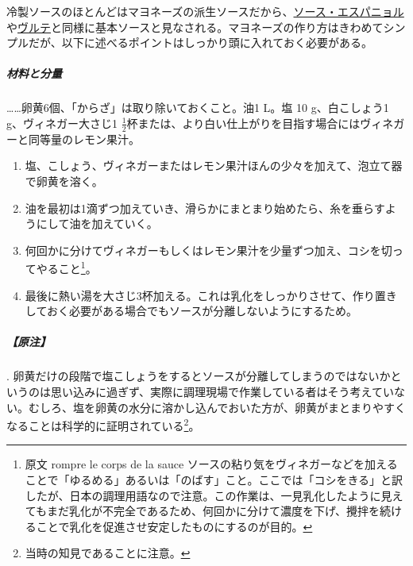 \begin{recette}

 

冷製ソースのほとんどはマヨネーズの派生ソースだから、\protect\hyperlink{sauce-espagnole}{ソース・エスパニョル}や\protect\hyperlink{veloute}{ヴルテ}と同様に基本ソースと見なされる。マヨネーズの作り方はきわめてシンプルだが、以下に述べるポイントはしっかり頭に入れておく必要がある。

\hypertarget{proportions-mayonnaise}{%
\subparagraph{材料と分量}\label{proportions-mayonnaise}}

\ldots{}\ldots{}卵黄6個、「からざ」は取り除いておくこと。油1 L。塩 10
g、白こしょう1 g、ヴィネガー大さじ1
\(\frac{1}{2}\)杯または、より白い仕上がりを目指す場合にはヴィネガーと同等量のレモン果汁。

\begin{enumerate}
\def\labelenumi{\arabic{enumi}.}
\item
  塩、こしょう、ヴィネガーまたはレモン果汁ほんの少々を加えて、泡立て器で卵黄を溶く。
\item
  油を最初は1滴ずつ加えていき、滑らかにまとまり始めたら、糸を垂らすようにして油を加えていく。
\item
  何回かに分けてヴィネガーもしくはレモン果汁を少量ずつ加え、コシを切ってやること\footnote{原文
    rompre le corps de la sauce
    ソースの粘り気をヴィネガーなどを加えることで「ゆるめる」あるいは「のばす」こと。ここでは「コシをきる」と訳したが、日本の調理用語なので注意。この作業は、一見乳化したように見えてもまだ乳化が不完全であるため、何回かに分けて濃度を下げ、攪拌を続けることで乳化を促進させ安定したものにするのが目的。}。
\item
  最後に熱い湯を大さじ3杯加える。これは乳化をしっかりさせて、作り置きしておく必要がある場合でもソースが分離しないようにするため。
\end{enumerate}

\hypertarget{nota-mayonnaise}{%
\subparagraph{【原注】}\label{nota-mayonnaise}}

.
卵黄だけの段階で塩こしょうをするとソースが分離してしまうのではないかというのは思い込みに過ぎず、実際に調理現場で作業している者はそう考えていない。むしろ、塩を卵黄の水分に溶かし込んでおいた方が、卵黄がまとまりやすくなることは科学的に証明されている\footnote{当時の知見であることに注意。}。


\end{recette}
